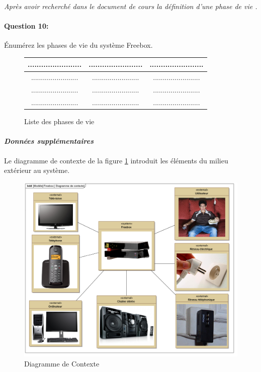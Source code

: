 \textit{Après avoir recherché dans le document de cours la définition d'une \og phase de vie \fg.}

\paragraph{Question 10:} Énumérez les phases de vie du système Freebox.

\begin{figure}[!h]
\begin{center}
\begin{tabular}{|c|c|c|}
\hline
........................ & ........................ & ........................ \\
\hline
........................ & ........................ & ........................ \\
\hline
........................ & ........................ & ........................ \\
\hline
........................ & ........................ & ........................ \\
\hline
\end{tabular}
\end{center}
\caption{Liste des phases de vie}
\end{figure}

\paragraph{\textit{Données supplémentaires}}

Le diagramme de contexte de la figure \ref{fig:image35} introduit les éléments du milieu extérieur au système.

\begin{figure}[!h]
\begin{center}
\includegraphics[width=0.7\linewidth]{img/Freebox_contexte}
\caption{Diagramme de Contexte}
\label{fig:image35}
\end{center}
\end{figure}

